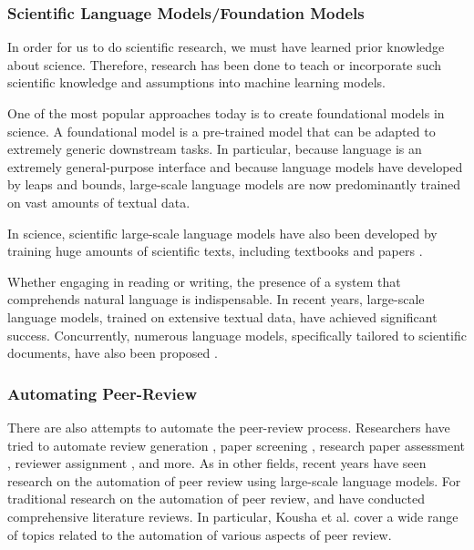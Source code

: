 \subsubsection{Scientific Language Models/Foundation Models}
In order for us to do scientific research, we must have learned prior knowledge about science. Therefore, research has been done to teach or incorporate such scientific knowledge and assumptions into machine learning models.

One of the most popular approaches today is to create foundational models in science. A foundational model is a pre-trained model that can be adapted to extremely generic downstream tasks. In particular, because language is an extremely general-purpose interface and because language models have developed by leaps and bounds, large-scale language models are now predominantly trained on vast amounts of textual data.

In science, scientific large-scale language models have also been developed by training huge amounts of scientific texts, including textbooks and papers \cite{taylor2022galactica}.


Whether engaging in reading or writing, the presence of a system that comprehends natural language is indispensable. In recent years, large-scale language models, trained on extensive textual data, have achieved significant success. Concurrently, numerous language models, specifically tailored to scientific documents, have also been proposed \cite{beltagy2019scibert,singh2022scirepeval,nadkarni2021scientific,cohan2020specter,gupta2022matscibert,taylor2022galactica}.



\subsubsection{Automating Peer-Review}
There are also attempts to automate the peer-review process. Researchers have tried to automate review generation \cite{yuan2022can}, paper screening \cite{schulz2022future}, research paper assessment \cite{kousha2022artificial}, reviewer assignment \cite{zhao2022reviewer}, and more. As in other fields, recent years have seen research on the automation of peer review using large-scale language models. For traditional research on the automation of peer review, \cite{kousha2022artificial} and \cite{lin2021automated1} have conducted comprehensive literature reviews. In particular, Kousha et al. cover a wide range of topics related to the automation of various aspects of peer review.

